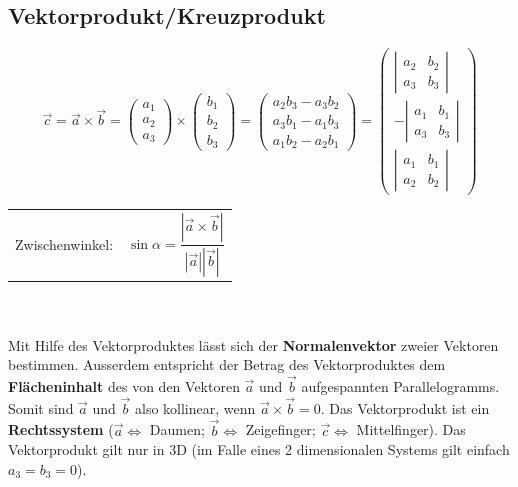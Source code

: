 \subsection{Vektorprodukt/Kreuzprodukt}
	\begin{equation*}
		\vec{c} = \vec{a} \times \vec{b} = \left(\begin{array}{c} a_1 \\ a_2 \\ a_3 \end{array}\right) \times
		\left(\begin{array}{c} b_1 \\ b_2 \\ b_3 \end{array}\right) = \left(\begin{array}{c}
			a_2b_3 - a_3b_2\\
			a_3b_1 - a_1b_3\\
			a_1b_2 - a_2b_1
		\end{array}\right)
		=\left(\begin{array}{c}
			\left|\begin{array}{cc}
				a_2 & b_2 \\
				a_3 & b_3 \end{array}\right|\\
			-\left|\begin{array}{cc}
				a_1 & b_1 \\
				a_3 & b_3 \end{array}\right|\\
			\left|\begin{array}{cc}
				a_1 & b_1 \\
				a_2 & b_2 \end{array}\right|
		\end{array}\right)
	\end{equation*}

	\begin{tabular}{ll}
		Zwischenwinkel: &
		\begin{equation*}
			\sin\alpha = \frac{|\vec{a} \times \vec{b}|}{|\vec{a}||\vec{b}|}
		\end{equation*}
	\end{tabular}\\ \\

	Mit Hilfe des Vektorproduktes lässt sich der \textbf{Normalenvektor}
	zweier Vektoren bestimmen. Ausserdem entspricht der Betrag des Vektorproduktes
	dem \textbf{Flächeninhalt} des von den Vektoren $\vec{a}$ und $\vec{b}$
	aufgespannten Parallelogramms. Somit sind $\vec{a}$ und $\vec{b}$ also
	kollinear, wenn $\vec{a}\times\vec{b}=0$. Das Vektorprodukt ist ein
	\textbf{Rechtssystem}
	($\vec{a} \Leftrightarrow$ Daumen; $\vec{b} \Leftrightarrow$ Zeigefinger;
	$\vec{c} \Leftrightarrow$ Mittelfinger). Das Vektorprodukt gilt nur in 3D (im
	Falle eines 2 dimensionalen Systems gilt einfach $a_3 = b_3 = 0$).

